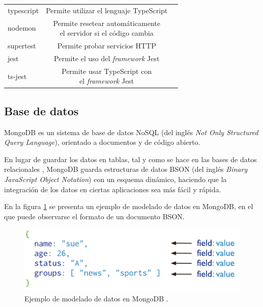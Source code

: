\begin{table}[H]
\begin{tabular}{l c c}
		typescript \citep{WEBSITE:TYPESCRIPTLIBRARY} & Permite utilizar el lenguaje TypeScript \\
		nodemon \citep{WEBSITE:NODEMON} & \shortstack{Permite resetear automáticamente \\ el servidor si el código cambia} \\	
		supertest \citep{WEBSITE:SUPERTEST} & Permite probar servicios HTTP \\
		jest \citep{WEBSITE:JESTLIBRARY} & Permite el uso del \emph{framework} Jest \\
		ts-jest \citep{WEBSITE:TSJEST}& \shortstack{Permite usar TypeScript con \\ el \emph{framework} Jest} \\
		\bottomrule
		\hline
	\end{tabular}
	\label{tab:tablaBibliotecasNodejs}
\end{table}

\subsection{Base de datos}

MongoDB \citep{WEBSITE:MONGODB} es un sistema de base de datos NoSQL (del inglés \textit{Not Only Structured Query Language})\citep{WEBSITE:NOSQL}, orientado a documentos \citep{WEBSITE:BASEDEDATOSDOCUMENTAL} y de código abierto.

En lugar de guardar los datos en tablas, tal y como se hace en las bases de datos relacionales \citep{WEBSITE:BASEDEDATOSRELACIONAL}, MongoDB guarda estructuras de datos BSON (del inglés \textit{Binary JavaScript Object Notation}) \citep{WEBSITE:BSON} con un esquema dinámico, haciendo que la integración de los datos en ciertas aplicaciones sea más fácil y rápida. 

En la figura \ref{fig:ejemploDeModeladoDeDatosEnMongoDB} se presenta un ejemplo de modelado de datos en MongoDB, en el que puede observarse el formato de un documento BSON.

\newpage
\begin{figure}[H]
	\centering
	\includegraphics[width=.8\textwidth]{./Figures/Ejemplo de modelado de datos en MongoDB.png}
	\caption{Ejemplo de modelado de datos en MongoDB \protect\footnotemark.}
	\label{fig:ejemploDeModeladoDeDatosEnMongoDB}
\end{figure}

